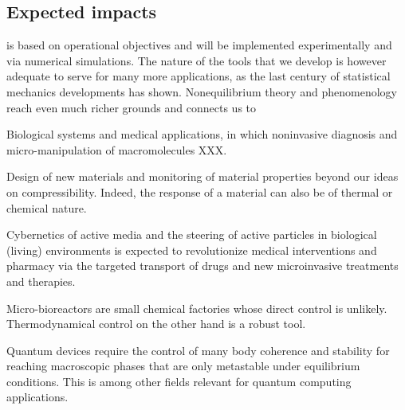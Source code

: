 \subsection{Expected impacts}


\TheProject is based on operational objectives and will be implemented experimentally and
via numerical simulations.
%
The nature of the tools that we develop is however adequate to serve for many more
applications, as the last century of statistical mechanics developments has shown.
%
Nonequilibrium theory and phenomenology reach even much richer grounds and connects us to
\begin{compactitem}
\item Biological systems and medical applications, in which noninvasive diagnosis and
micro-manipulation of macromolecules XXX.
\item Design of new materials and monitoring of material properties beyond our ideas on
compressibility. Indeed, the response of a material can also be of thermal or chemical
nature.
\item Cybernetics of active media and the steering of active particles in biological
(living) environments is expected to revolutionize medical interventions and pharmacy via
the targeted transport of drugs and new microinvasive treatments and therapies.
\item Micro-bioreactors are small chemical factories whose direct control is
unlikely. Thermodynamical control on the other hand is a robust tool.
\item Quantum devices require the control of many body coherence and stability for reaching
macroscopic phases that are only metastable under equilibrium conditions. This is among
other fields relevant for quantum computing applications.
\end{compactitem}

